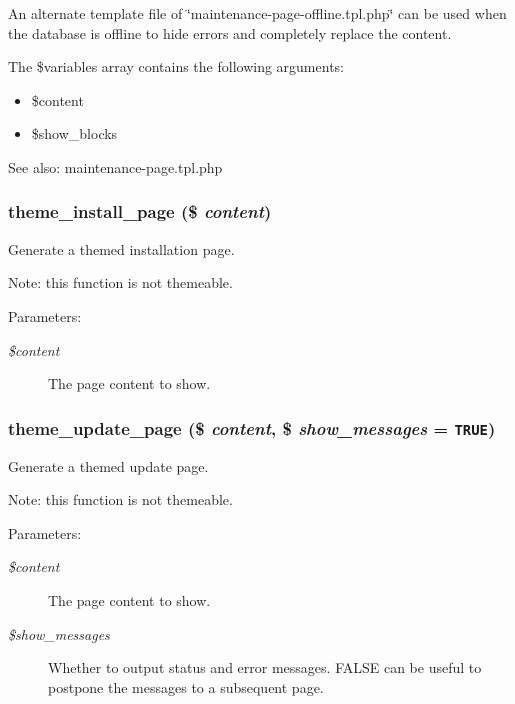 An alternate template file of \char`\"{}maintenance-page-offline.tpl.php\char`\"{} can be used when the database is offline to hide errors and completely replace the content.

The \$variables array contains the following arguments:\begin{itemize}
\item \$content\item \$show\_\-blocks\end{itemize}


\begin{Desc}
\item[See also:]maintenance-page.tpl.php \end{Desc}
\hypertarget{theme_8maintenance_8inc_5f691f589f18990cce7f967be939172d}{
\subsubsection[{theme\_\-install\_\-page}]{\setlength{\rightskip}{0pt plus 5cm}theme\_\-install\_\-page (\$ {\em content})}}
\label{theme_8maintenance_8inc_5f691f589f18990cce7f967be939172d}


Generate a themed installation page.

Note: this function is not themeable.

\begin{Desc}
\item[Parameters:]
\begin{description}
\item[{\em \$content}]The page content to show. \end{description}
\end{Desc}
\hypertarget{theme_8maintenance_8inc_c6c65623ac5a4e2ba448b2df7a1ccd66}{
\subsubsection[{theme\_\-update\_\-page}]{\setlength{\rightskip}{0pt plus 5cm}theme\_\-update\_\-page (\$ {\em content}, \/  \$ {\em show\_\-messages} = {\tt TRUE})}}
\label{theme_8maintenance_8inc_c6c65623ac5a4e2ba448b2df7a1ccd66}


Generate a themed update page.

Note: this function is not themeable.

\begin{Desc}
\item[Parameters:]
\begin{description}
\item[{\em \$content}]The page content to show. \item[{\em \$show\_\-messages}]Whether to output status and error messages. FALSE can be useful to postpone the messages to a subsequent page. \end{description}
\end{Desc}
